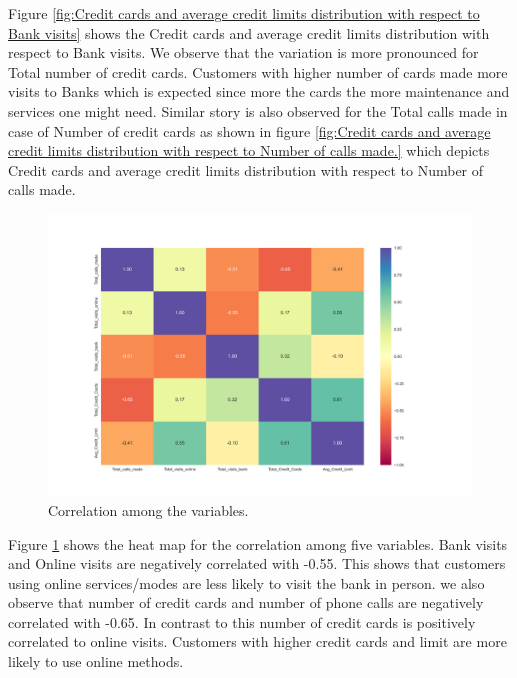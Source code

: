 \documentclass[10pt,a4paper]{style}
\begin{document}
		Figure \ref{fig:Credit cards and average credit limits distribution with respect to Bank visits} shows the Credit cards and average credit limits distribution with respect to Bank visits. We observe that the variation is more pronounced for Total number of credit cards. Customers with higher number of cards made more visits to Banks which is expected since more the cards the more maintenance and services one might need. Similar story is also observed for the Total calls made in case of Number of credit cards as shown in figure \ref{fig:Credit cards and average credit limits distribution with respect to Number of calls made.} which depicts Credit cards and average credit limits distribution with respect to Number of calls made.
		
		\begin{figure}[h]
			\centering
			\includegraphics[width=\textwidth,height=10 cm]{corr.png}
			\caption{Correlation among the variables.}
			\label{fig:corrt}
		\end{figure}
		Figure \ref{fig:corrt} shows the heat map for the correlation among five variables. Bank visits and Online visits are negatively correlated with -0.55. This shows that customers using online services/modes are less likely to visit the bank in person. we also observe that number of credit cards and number of phone calls are negatively correlated with -0.65. In contrast to this number of credit cards is positively correlated to online visits. Customers with higher credit cards and limit are more likely to use online methods.
	\clearpage	
\end{document}
